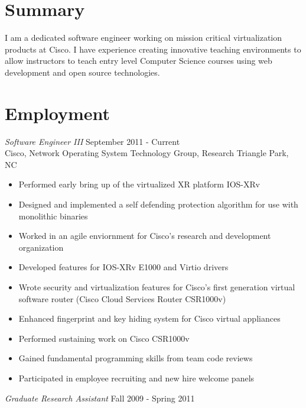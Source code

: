 \documentclass[line,margin]{res}
\begin{document}
\address{500 North Duke Street Durham, NC 27701}
\address{Email: vtwoods@gmail.com --- Cell: (703)475-1337}

 
\begin{resume}

\section{Summary} I am a dedicated software engineer working on mission critical virtualization products at Cisco.  I have experience creating innovative teaching environments to allow instructors to teach entry level Computer Science courses using web development and open source technologies.

\section{Employment}
        {\sl Software Engineer III} \hfill September 2011 - Current \\
        Cisco, Network Operating System Technology Group, Research Triangle Park, NC
        \begin{itemize}  \itemsep -2pt %
             \item Performed early bring up of the virtualized XR platform IOS-XRv
             \item Designed and implemented a self defending protection algorithm for use with monolithic binaries
             \item Worked in an agile enviornment for Cisco's research and development organization
             \item Developed features for IOS-XRv E1000 and Virtio drivers
             \item Wrote security and virtualization features for Cisco's first generation virtual software router (Cisco Cloud Services Router CSR1000v)  
             \item Enhanced fingerprint and key hiding system for Cisco virtual appliances
             \item Performed sustaining work on Cisco CSR1000v
             \item Gained fundamental programming skills from team code reviews
             \item Participated in employee recruiting and new hire welcome panels
        \end{itemize}
        {\sl Graduate Research Assistant} \hfill  Fall 2009 - Spring 2011 \\

\end{resume}
\end{document}
